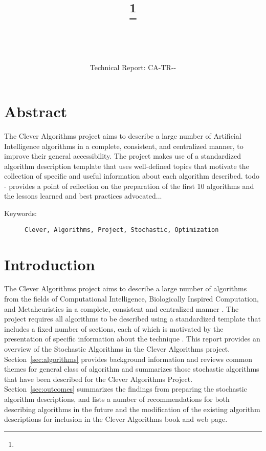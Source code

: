 \documentclass[a4paper, 11pt]{article}
\title{{\myreporttitle}\footnote{\myreportlicense}}
\author{\myreportauthor\\{\myreportemail}\\\small\myreportproject}
\date{\myreportfulldate\\{\small{Technical Report: CA-TR-{\myreportdate}-\myreportversion}}}
\begin{document}
\maketitle

\section*{Abstract} 
The Clever Algorithms project aims to describe a large number of Artificial Intelligence algorithms in a complete, consistent, and centralized manner, to improve their general accessibility. 
The project makes use of a standardized algorithm description template that uses well-defined topics that motivate the collection of specific and useful information about each algorithm described.
todo - provides a point of reflection on the preparation of the first 10 algorithms and the lessons learned and best practices advocated...


\begin{description}
	\item[Keywords:] {\small\texttt{Clever, Algorithms, Project, Stochastic, Optimization}}
\end{description} 

\section{Introduction}
\label{sec:introduction}
The Clever Algorithms project aims to describe a large number of algorithms from the fields of Computational Intelligence, Biologically Inspired Computation, and Metaheuristics in a complete, consistent and centralized manner \cite{Brownlee2010}.
The project requires all algorithms to be described using a standardized template that includes a fixed number of sections, each of which is motivated by the presentation of specific information about the technique \cite{Brownlee2010a}.
This report provides an overview of the Stochastic Algorithms in the Clever Algorithms project. 
Section~\ref{sec:algorithms} provides background information and reviews common themes for general class of algorithm and summarizes those stochastic algorithms that have been described for the Clever Algorithms Project.
Section~\ref{sec:outcomes} summarizes the findings from preparing the stochastic algorithm descriptions, and lists a number of recommendations for both describing algorithms in the future and the modification of the existing algorithm descriptions for inclusion in the Clever Algorithms book and web page.
\end{document}
